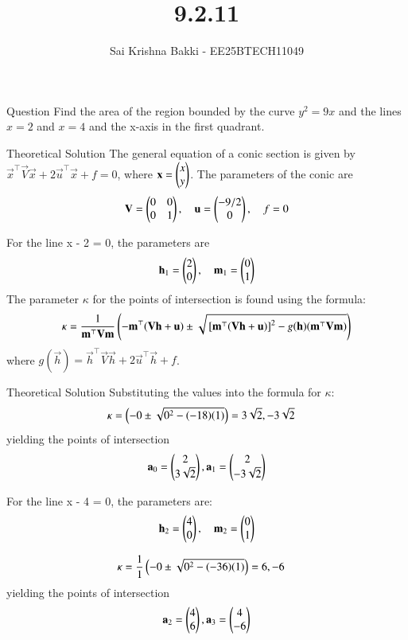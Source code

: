 \documentclass{beamer}
\title %
{9.2.11}
\date{}
\author %
{Sai Krishna Bakki - EE25BTECH11049}
\begin{document}
\frame{\titlepage}
\begin{frame}{Question}
Find the area of the region bounded by the curve $y^2 = 9x$ and the lines $x = 2$ and $x = 4$ and the x-axis in the first quadrant.
\end{frame}
\begin{frame}{Theoretical Solution}
    The general equation of a conic section is given by $\vec{x}^\top\vec{V}\vec{x} + 2\vec{u}^\top\vec{x} + f = 0$, where $\mathbf{x} = \begin{pmatrix}x \\ y\end{pmatrix}$.
The parameters of the conic are
\begin{align}
\mathbf{V} = \begin{pmatrix}0 & 0 \\ 0 & 1\end{pmatrix}, \quad \mathbf{u} = \begin{pmatrix}-9/2 \\ 0\end{pmatrix}, \quad f = 0
\end{align}

For the line x - 2 = 0, the parameters are
\begin{align}
\mathbf{h}_1 = \begin{pmatrix}2 \\ 0\end{pmatrix}, \quad \mathbf{m}_1 = \begin{pmatrix}0 \\ 1\end{pmatrix}
\end{align}
The parameter $\kappa$ for the points of intersection is found using the formula:
\begin{align}
\kappa = \frac{1}{\mathbf{m}^\top \mathbf{V} \mathbf{m}}\left(-\mathbf{m}^\top(\mathbf{V}\mathbf{h}+\mathbf{u}) \pm \sqrt{{}\left[\mathbf{m}^\top(\mathbf{V}\mathbf{h}+\mathbf{u})\right]^2 - g(\mathbf{h})(\mathbf{m}^\top \mathbf{V} \mathbf{m})}\right)
\end{align}
where $g(\vec{h}) = \vec{h}^\top \vec{V} \vec{h} + 2\vec{u}^\top \vec{h} + f$.
\end{frame}
\begin{frame}{Theoretical Solution}
Substituting the values into the formula for $\kappa$:
\begin{align}
\kappa &= \left(-0 \pm \sqrt{0^2 - (-18)(1)}\right) = 3\sqrt{2},-3\sqrt{2}
\end{align}
yielding the points of intersection
\begin{align}
\mathbf{a}_0 =  \begin{pmatrix}2 \\ 3\sqrt{2}\end{pmatrix},\mathbf{a}_1 =  \begin{pmatrix}2 \\ -3\sqrt{2}\end{pmatrix}
\end{align}

For the line x - 4 = 0, the parameters are:
\begin{align}
\mathbf{h}_2 = \begin{pmatrix}4 \\ 0\end{pmatrix}, \quad \mathbf{m}_2 = \begin{pmatrix}0 \\ 1\end{pmatrix}
\end{align}

\begin{align}
\kappa &= \frac{1}{1}\left(-0 \pm \sqrt{0^2 - (-36)(1)}\right) = 6,-6
\end{align}
yielding the points of intersection
\begin{align}
\mathbf{a}_2 = \begin{pmatrix}4 \\ 6\end{pmatrix},\mathbf{a}_3 = \begin{pmatrix}4 \\ -6\end{pmatrix}
\end{align}
\end{frame}
\end{document}
